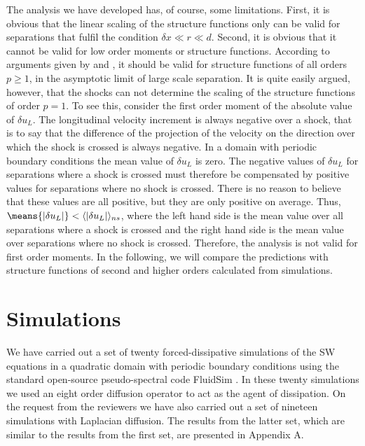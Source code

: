 The analysis we have developed has, of course, some limitations. First, it is obvious that  the linear scaling of the structure functions only can be valid for separations  that fulfil the condition $ \delta x \ll r \ll d $.  Second, it is obvious that it  cannot be valid for low order moments or structure functions. According to arguments given by  \cite{BouchaudMezardParisi1995}  and \cite{Weinan}, it should be valid for structure functions of all orders $ p  \ge 1 $, in the asymptotic limit of large scale separation.  It is quite easily argued, however, that the shocks can not determine the scaling of the structure functions of order $ p=1 $. 
To see this, consider the first order moment of the absolute value of $ \delta u_L $. 
The longitudinal velocity increment is always negative over a shock, that is to say that the difference of the projection of the velocity on the direction over which the shock is crossed is always negative. In a domain with periodic boundary conditions the mean value of $ \delta u_L $   is zero. The negative values of $ \delta u_L $ for separations where a shock is crossed must therefore be compensated by positive values for separations where no shock is crossed. There is no reason to believe that these values are all positive,  but they are only positive on average. Thus, 
$ \means{ |\delta u_L | } < \langle | \delta u_L | \rangle _{ns} $, where the left hand side is the mean value over all separations where a shock is crossed and the right hand side is the mean value over separations where no shock is crossed.  Therefore, the analysis is not valid for first order moments. In the following, we will compare the predictions with structure functions of second and higher orders calculated from simulations. 









\section{Simulations}

We have carried out a set of twenty forced-dissipative simulations of the SW
equations in a quadratic domain with periodic boundary conditions using the
standard open-source pseudo-spectral code FluidSim \cite[]{fluiddyn, fluidfft,
fluidsim}. In these twenty simulations we used an eight order diffusion operator to act as the agent of dissipation. 
 On the request from the reviewers we have also carried out a set of nineteen simulations with  Laplacian diffusion. The results from the latter set, which are similar to the results from the first set,  are presented in Appendix A.

